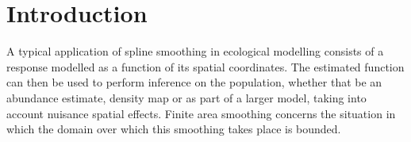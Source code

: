 \documentclass[useAMS,referee]{biom}
\begin{document}

\maketitle



%
\section{Introduction \label{IN}}

A typical application of spline smoothing in ecological modelling consists of a response modelled as a function of its spatial coordinates. The estimated function can then be used to perform inference on the population, whether that be an abundance estimate, density map or as part of a larger model, taking into account nuisance spatial effects. Finite area smoothing concerns the situation in which the domain over which this smoothing takes place is bounded. 
\end{document}
